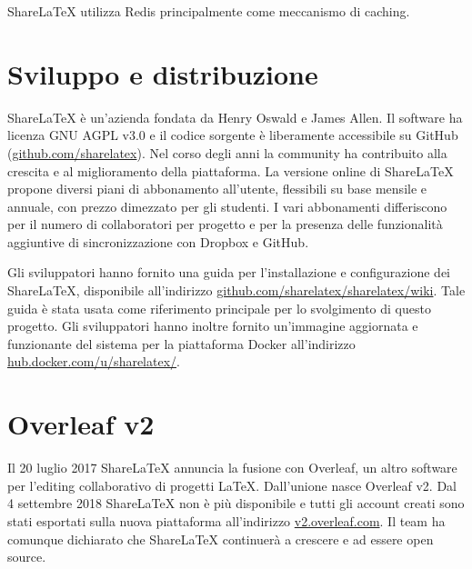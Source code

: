 ShareLaTeX utilizza Redis principalmente come meccanismo di caching.


\section{Sviluppo e distribuzione}
ShareLaTeX è un'azienda fondata da Henry Oswald e James Allen. Il software ha licenza GNU AGPL v3.0 e il codice sorgente è liberamente accessibile su GitHub (\url{github.com/sharelatex}). Nel corso degli anni la community ha contribuito alla crescita e al miglioramento della piattaforma. La versione online di ShareLaTeX propone diversi piani di abbonamento all'utente, flessibili su base mensile e annuale, con prezzo dimezzato per gli studenti. I vari abbonamenti differiscono per il numero di collaboratori per progetto e per la presenza delle funzionalità aggiuntive di sincronizzazione con Dropbox e GitHub.

Gli sviluppatori hanno fornito una guida per l'installazione e configurazione dei ShareLaTeX, disponibile all'indirizzo \url{github.com/sharelatex/sharelatex/wiki}. Tale guida è stata usata come riferimento principale per lo svolgimento di questo progetto. Gli sviluppatori hanno inoltre fornito un'immagine aggiornata e funzionante del sistema per la piattaforma Docker all'indirizzo \url{hub.docker.com/u/sharelatex/}.

\section{Overleaf v2}
Il 20 luglio 2017 ShareLaTeX annuncia la fusione con Overleaf, un altro software per l'editing collaborativo di progetti \LaTeX. Dall'unione nasce Overleaf v2. Dal 4 settembre 2018 ShareLaTeX non è più disponibile e tutti gli account creati sono stati esportati sulla nuova piattaforma all'indirizzo \url{v2.overleaf.com}. Il team ha comunque dichiarato che ShareLaTeX continuerà a crescere e ad essere open source.

